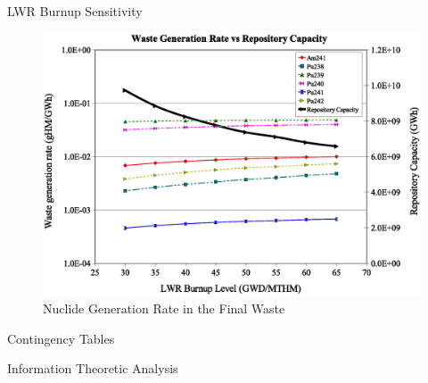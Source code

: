 \documentclass[pdf, autumn, slideColor, nocolorBG]{prosper}
\begin{document}
\begin{slide}{LWR Burnup Sensitivity}
\begin{center}
\begin{figure}
\includegraphics[scale=0.4]{figs/LWR_BUd_sensitivity_RepCap.eps}
\caption{Nuclide Generation Rate in the Final Waste}
\end{figure}
\end{center}
\end{slide}






%
%

\begin{slide}{Contingency Tables}
\vspace{3.5cm}
\begin{center}
\Large
Information Theoretic Analysis
\end{center}
\end{slide}
\end{document}
